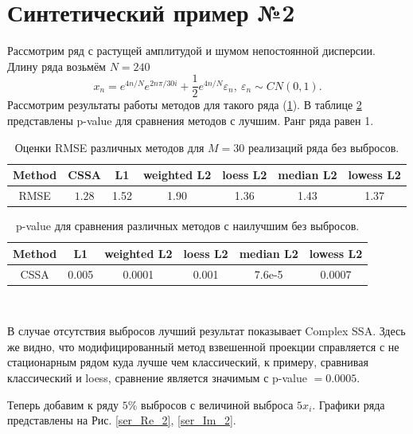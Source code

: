 \documentclass[specialist,
               substylefile = spbu.rtx,
               subf,href,colorlinks=true, 12pt]{disser}
\begin{document}
\section{Синтетический пример №2}

Рассмотрим ряд с растущей амплитудой и шумом непостоянной дисперсии.
Длину ряда возьмём $N = 240$
$$x_n = e^{4n/N} e^{2n\pi/30i} + \frac{1}{2}e^{4n/N} \varepsilon_n, ~ \varepsilon_n \sim CN(0,1).$$ 
Рассмотрим результаты работы методов для такого ряда (\ref{tab3}).  В таблице \ref{tab: pval3} представлены p-value для сравнения методов с лучшим. Ранг ряда равен 1.

\begin{table}[H]
	\begin{center}
		\caption{Оценки RMSE различных методов для $M = 30$ реализаций ряда без выбросов.}
		\label{tab3}
		\begin{tabular}{|c|c|c|c|c|c|c|}
			\hline
			Method 	& CSSA & L1 & weighted L2 & loess L2 & median L2 & lowess L2 \\ 
			\hline
			RMSE & $\mathbf{1.28}$  & 1.52  & 1.90 & 1.36 & 1.43 & 1.37\\
			\hline
		\end{tabular}
	\end{center}
\end{table}

\begin{table}[H]
	\caption{p-value для сравнения различных методов с наилучшим без выбросов.}
	\label{tab: pval3}
	\begin{center}
		\begin{tabular}{|c|c|c|c|c|c|}
			\hline
			Method & L1 & weighted L2 & loess L2 & median L2 & lowess L2  \\ 
			\hline
			CSSA & 0.005   & 0.0001 & 0.001  & 7.6e-5 & 0.0007  \\
			\hline
		\end{tabular} \\
	\end{center}
\end{table}

В случае отсутствия выбросов лучший результат показывает Complex SSA. Здесь же видно, что модифицированный метод взвешенной проекции справляется с не стационарным рядом куда лучше чем классический, к примеру, сравнивая классический и loess, сравнение является значимым с p-value $ = 0.0005$. 

Теперь добавим к ряду $5\%$ выбросов с величиной выброса $5x_i$. Графики ряда представлены на Рис. \ref{ser_Re_2}, \ref{ser_Im_2}.
\end{document}
